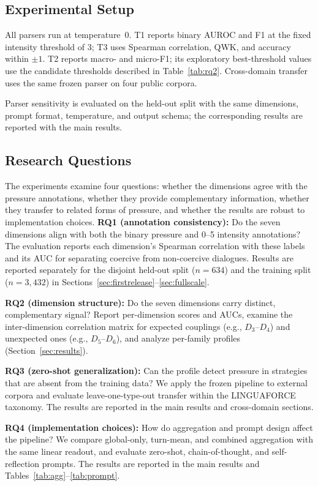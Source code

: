 \documentclass[conference]{IEEEtran}
\begin{document}
\subsection{Experimental Setup}
All parsers run at temperature~$0$. T1 reports binary AUROC and F1 at the
fixed intensity threshold of 3; T3 uses Spearman correlation, QWK, and
accuracy within $\pm1$. T2 reports macro- and micro-F1; its exploratory
best-threshold values use the candidate thresholds described in Table~\ref{tab:rq2}.
Cross-domain transfer uses the same frozen parser on four public corpora.

Parser sensitivity is evaluated on the held-out split with the same dimensions,
prompt format, temperature, and output schema; the corresponding results are
reported with the main results.


\subsection{Research Questions}
The experiments examine four questions: whether the dimensions agree with the
pressure annotations, whether they provide complementary information, whether
they transfer to related forms of pressure, and whether the results are robust
to implementation choices.
\textbf{RQ1 (annotation consistency):} Do the seven dimensions align with
both the binary pressure and 0--5 intensity annotations? The evaluation reports each
dimension's Spearman correlation with these labels and its AUC for separating
coercive from non-coercive dialogues. Results are reported separately for the
disjoint held-out split ($n{=}634$) and the training split
($n{=}3{,}432$) in Sections~\ref{sec:firstrelease}--\ref{sec:fullscale}.

\textbf{RQ2 (dimension structure):} Do the seven dimensions carry distinct,
complementary signal? Report per-dimension scores and AUCs, examine the
inter-dimension correlation matrix for expected couplings (e.g., $D_3$--$D_4$)
and unexpected ones (e.g., $D_5$--$D_6$), and analyze per-family profiles
(Section~\ref{sec:results}).

\textbf{RQ3 (zero-shot generalization):} Can the profile detect pressure in
strategies that are absent from the training data? We apply the frozen
pipeline to external corpora and evaluate leave-one-type-out transfer within
the LINGUAFORCE taxonomy. The results are reported in the main results and
cross-domain sections.

\textbf{RQ4 (implementation choices):} How do aggregation and prompt design
affect the pipeline? We compare global-only, turn-mean, and combined
aggregation with the same linear readout, and evaluate zero-shot,
chain-of-thought, and self-reflection prompts. The results are reported in
the main results and Tables~\ref{tab:agg}--\ref{tab:prompt}.
\end{document}
